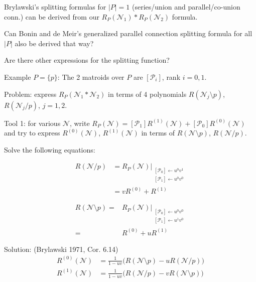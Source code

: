 \documentclass[%
  slidesonly,%
  semlayer,%
  amsmath
  ]{seminar}                                  %
\begin{document}
\begin{slide}
Brylawski's splitting formulas for $|P|=1$ (series/union and parallel/co-union conn.)
can be derived from our 
$R_P(\mathcal{N}_1)*R_P(\mathcal{N}_2)$ formula.

Can Bonin and de Meir's generalized parallel connection
splitting formula for all $|P|$ also be 
derived that way?  

Are there other expressions for the splitting function?
\end{slide}

\begin{slide}
Example $P=\{p\}$: The 2 matroids over $P$ are $[\mathcal{P}_i]$, rank $i=0,1$.

Problem: express $R_P(\mathcal{N}_1*\mathcal{N}_2)$ in terms of 
4 polynomials $R(\mathcal{N}_j\setminus p)$, $R(\mathcal{N}_j/p)$, $j=1,2$.

Tool 1: for various $\mathcal{N}$, write
$R_P(\mathcal{N}) = [\mathcal{P}_1]R^{(1)}(\mathcal{N}) + 
                   [\mathcal{P}_0]R^{(0)}(\mathcal{N})$
and try to express $R^{(0)}(\mathcal{N})$, $R^{(1)}(\mathcal{N})$ in terms
of $R(\mathcal{N}\setminus p)$, $R(\mathcal{N}/ p)$.

Solve the following equations:

\begin{minipage}{2.1in}
\begin{align*}
R(\mathcal{N}/ p) &= R_P(\mathcal{N})|_{ \begin{array}{c}
					\left[\mathcal{P}_0\right]\leftarrow u^0v^1\\
                                        \left[\mathcal{P}_1\right]\leftarrow u^0v^0
					\end{array}} \\
                  &= vR^{(0)} + R^{(1)}
\end{align*}
\end{minipage}
\begin{minipage}{2in}
\begin{align*}
R(\mathcal{N}\setminus p) =& R_P(\mathcal{N})|_{ \begin{array}{c}
					\left[\mathcal{P}_0\right]\leftarrow u^0v^0\\
                                        \left[\mathcal{P}_1\right]\leftarrow u^1v^0
					\end{array}}\\
                          =& R^{(0)} + uR^{(1)}
\end{align*}
\end{minipage}

Solution: (Brylawski 1971, Cor. 6.14)
\begin{align*}
R^{(0)}(\mathcal{N}) &= \frac{1}{1-uv}\big(R(\mathcal{N}\setminus p) - uR(\mathcal{N}/ p)\big)\\
R^{(1)}(\mathcal{N}) &= \frac{1}{1-uv}\big(R(\mathcal{N}/ p) - vR(\mathcal{N}\setminus p)\big)
\end{align*}
\end{slide}
\end{document}
